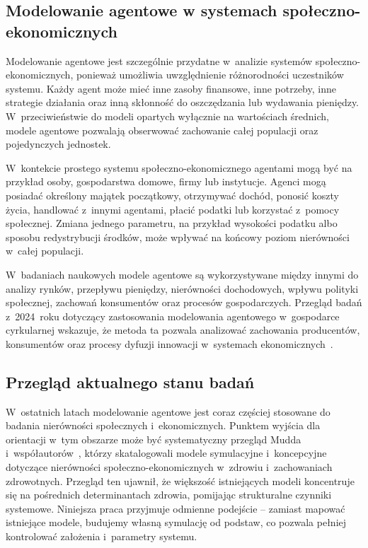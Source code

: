 \documentclass[polish]{projectreport}
\begin{document}
\subsection{Modelowanie agentowe w systemach spo\l{}eczno-ekonomicznych}
\label{sec:abm}

Modelowanie agentowe jest szczeg\'olnie przydatne w~analizie system\'ow
spo\l{}eczno-ekonomicznych, poniewa\.{z} umo\.{z}liwia uwzgl\k{e}dnienie r\'o\.{z}norodno\'sci uczestnik\'ow
systemu. Ka\.{z}dy agent mo\.{z}e mie\'{c} inne zasoby finansowe, inne potrzeby, inne strategie
dzia\l{}ania oraz inn\k{a} sk\l{}onno\'s\'{c} do oszcz\k{e}dzania lub wydawania pieni\k{e}dzy. W~przeciwie\'nstwie
do modeli opartych wy\l{}\k{a}cznie na warto\'sciach \'srednich, modele agentowe pozwalaj\k{a}
obserwowa\'{c} zachowanie ca\l{}ej populacji oraz pojedynczych jednostek.

W~kontekcie prostego systemu spo\l{}eczno-ekonomicznego agentami mog\k{a} by\'{c} na przyk\l{}ad
osoby, gospodarstwa domowe, firmy lub instytucje. Agenci mog\k{a} posiada\'{c} okre\'slony
maj\k{a}tek pocz\k{a}tkowy, otrzymywa\'{c} doch\'od, ponosi\'{c} koszty \.{z}ycia, handlowa\'{c} z~innymi
agentami, p\l{}aci\'{c} podatki lub korzysta\'{c} z~pomocy spo\l{}ecznej. Zmiana jednego parametru,
na przyk\l{}ad wysoko\'sci podatku albo sposobu redystrybucji \'srodk\'ow, mo\.{z}e wp\l{}ywa\'{c} na
ko\'ncowy poziom nier\'owno\'sci w~ca\l{}ej populacji.

W~badaniach naukowych modele agentowe s\k{a} wykorzystywane mi\k{e}dzy innymi do analizy
rynk\'ow, przep\l{}ywu pieni\k{e}dzy, nier\'owno\'sci dochodowych, wp\l{}ywu polityki spo\l{}ecznej,
zachowa\'n konsument\'ow oraz proces\'ow gospodarczych. Przegl\k{a}d bada\'n z~2024~roku dotycz\k{a}cy
zastosowania modelowania agentowego w~gospodarce cyrkularnej wskazuje, \.{z}e metoda ta
pozwala analizowa\'{c} zachowania producent\'ow, konsument\'ow oraz procesy dyfuzji innowacji
w~systemach ekonomicznych~\cite{mudd2024}.

\subsection{Przegl\k{a}d aktualnego stanu bada\'n}
\label{sec:related}

W~ostatnich latach modelowanie agentowe jest coraz cz\k{e}\'sciej stosowane do badania
nier\'owno\'sci spo\l{}ecznych i~ekonomicznych. Punktem wyj\'scia dla orientacji w~tym obszarze
mo\.{z}e by\'{c} systematyczny przegl\k{a}d Mudda i~wsp\'o\l{}autor\'ow~\cite{mudd2024}, kt\'orzy skatalogowali
modele symulacyjne i~koncepcyjne dotycz\k{a}ce nier\'owno\'sci spo\l{}eczno-ekonomicznych
w~zdrowiu i~zachowaniach zdrowotnych. Przegl\k{a}d ten ujawni\l{}, \.{z}e wi\k{e}kszo\'s\'{c} istniej\k{a}cych
modeli koncentruje si\k{e} na po\'srednich determinantach zdrowia, pomijaj\k{a}c strukturalne
czynniki systemowe. Niniejsza praca przyjmuje odmienne podej\'scie -- zamiast mapowa\'{c}
istniej\k{a}ce modele, budujemy w\l{}asn\k{a} symulacj\k{e} od podstaw, co pozwala pe\l{}niej
kontrolowa\'{c} za\l{}o\.{z}enia i~parametry systemu.
\end{document}
